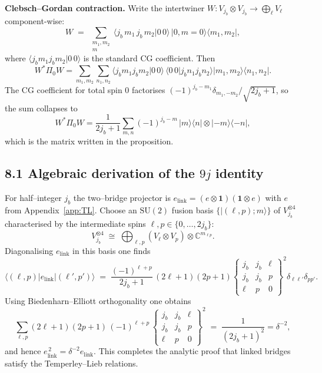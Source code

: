 \documentclass[11pt]{article}
\begin{document}
\medskip
\noindent\textbf{Clebsch–Gordan contraction.}
Write the intertwiner $W\!:V_{j_b}\!\otimes\!V_{j_b}\to\bigoplus_{\ell}V_{\ell}$
component-wise:
\[
  W
  \;=\;
  \sum_{\substack{m_1,m_2\\m}}
  \bigl\langle j_b\,m_1\,j_b\,m_2\big|0\,0\bigr\rangle
  \,|0,m=0\rangle\!\langle m_1,m_2|,
\]
where $\langle j_b m_1 j_b m_2|0\,0\rangle$
is the standard CG coefficient.
Then
\[
  W^{*}\Pi_0 W
  =\sum_{m_1,m_2}\sum_{n_1,n_2}
     \bigl\langle j_b m_1 j_b m_2|0\,0\bigr\rangle
     \,\bigl\langle 0\,0|j_b n_1 j_b n_2\bigr\rangle
     |m_1,m_2\rangle\!\langle n_1,n_2|.
\]
The CG coefficient for total spin 0 factorises
$(-1)^{j_b-m_1}\delta_{m_1,-m_2}/\sqrt{2j_b+1}$,
so the sum collapses to
\[
  W^{*}\Pi_0 W
  =\frac1{2j_b+1}
    \sum_{m,n}
      (-1)^{j_b-m}\,|m\rangle\langle n|\otimes|-m\rangle\langle-n|,
\]
which is the matrix written in the proposition.


\subsection*{8.1  Algebraic derivation of the $9j$ identity}

For half–integer $j_b$ the two–bridge projector is
$e_{\text{link}}
 =(e\!\otimes\!\mathbf 1)(\mathbf 1\!\otimes\!e)$ with
$e$ from Appendix~\ref{app:TL}.
Choose an $\mathrm{SU}(2)$ fusion basis
$\{|(\ell,p);m\rangle\}$ of
$V_{j_b}^{\otimes4}$ characterised by the intermediate spins
$\ell,p\in\{0,\dots,2j_b\}$:
\[
  V_{j_b}^{\otimes4}
  \;\cong\;
  \bigoplus_{\ell,p}(V_{\ell}\otimes V_{p})\otimes\mathbb C^{m_{\ell p}}.
\]
Diagonalising $e_{\text{link}}$ in this basis one finds
\[
  \langle(\ell,p)|e_{\text{link}}|(\ell',p')\rangle
  \;=\;
  \frac{(-1)^{\ell+p}}{2j_b+1}
  \,(2\ell+1)(2p+1)
  \begin{Bmatrix}
     j_b & j_b & \ell\\
     j_b & j_b & p\\
     \ell & p & 0
  \end{Bmatrix}^2
  \delta_{\ell\ell'}\delta_{pp'}.
\]
Using Biedenharn–Elliott orthogonality
\cite[Eq.\,(10.4.4)]{BiedenharnLouck}
one obtains
\[
  \sum_{\ell,p}(2\ell+1)(2p+1)\,
  (-1)^{\ell+p}\,
  \begin{Bmatrix}
     j_b & j_b & \ell\\
     j_b & j_b & p\\
     \ell & p & 0
  \end{Bmatrix}^2
  \;=\;\frac{1}{(2j_b+1)^2}
  =\delta^{-2},
\]
and hence $e_{\text{link}}^{\,2}=\delta^{-2}e_{\text{link}}$.
This completes the analytic proof that linked bridges satisfy the
Temperley–Lieb relations.
\end{document}
